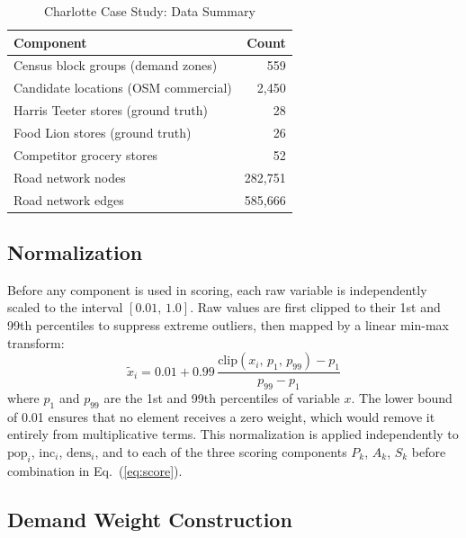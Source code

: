 \documentclass[conference]{IEEEtran}
\begin{document}
\begin{table}[!t]
\centering
\caption{Charlotte Case Study: Data Summary}
\label{tab:data_summary}
\begin{tabular}{lr}
\toprule
\textbf{Component} & \textbf{Count} \\
\midrule
Census block groups (demand zones)  & 559 \\
Candidate locations (OSM commercial)& 2{,}450 \\
Harris Teeter stores (ground truth) & 28 \\
Food Lion stores (ground truth)     & 26 \\
Competitor grocery stores           & 52 \\
Road network nodes                  & 282{,}751 \\
Road network edges                  & 585{,}666 \\
\bottomrule
\end{tabular}
\end{table}

\subsection{Normalization}
\label{sec:norm}

Before any component is used in scoring, each raw variable is
independently scaled to the interval $[0.01,\,1.0]$. Raw values are
first clipped to their 1st and 99th percentiles to suppress extreme
outliers, then mapped by a linear min-max transform:
\begin{equation}
\tilde{x}_i
  = 0.01 + 0.99\,\frac{
      \text{clip}(x_i,\,p_1,\,p_{99}) - p_1
    }{
      p_{99} - p_1
    }
\label{eq:norm}
\end{equation}
where $p_1$ and $p_{99}$ are the 1st and 99th percentiles of
variable $x$. The lower bound of 0.01 ensures that no element
receives a zero weight, which would remove it entirely from
multiplicative terms. This normalization is applied independently
to $\text{pop}_i$, $\text{inc}_i$, $\text{dens}_i$, and to each
of the three scoring components $P_k$, $A_k$, $S_k$ before
combination in Eq.~(\ref{eq:score}).

\subsection{Demand Weight Construction}
\end{document}
